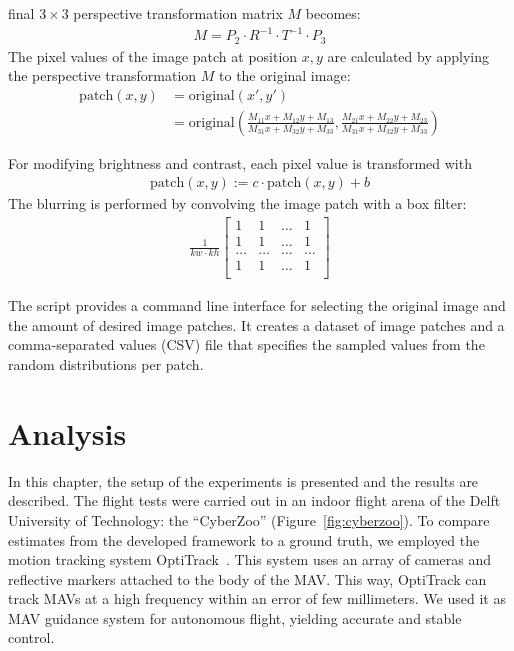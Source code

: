 \documentclass[11pt]{report}
\begin{document}
final $3 \times 3$ perspective transformation matrix $M$ becomes:
\begin{align*}
M =  P_2 \cdot R^{-1} \cdot T^{-1} \cdot P_3
\end{align*}
The pixel values of the image patch at position $x, y$ are calculated
by applying the perspective transformation $M$ to the original image:
\begin{align*}
  \text{patch}(x,y) & = \text{original}(x', y') \\
                    & = \text{original}\left(\frac{M_{11}x + M_{12}y + M_{13}}{M_{31}x + M_{32}y +
  M_{33}}, \frac{M_{21}x + M_{22}y + M_{23}}{M_{31}x + M_{32}y +
  M_{33}}\right)
\end{align*}

For modifying brightness and contrast, each pixel value is transformed
with
\begin{align*}
\text{patch}(x,y) := c \cdot \text{patch}(x,y) + b  
\end{align*}
The blurring is performed by convolving the image patch with a box
filter:
\begin{align*}
  \frac{1}{kw \cdot kh} 
  \begin{bmatrix}
    1 & 1 & \ldots & 1\\
    1 & 1 & \ldots & 1\\
    \ldots & \ldots & \ldots & \ldots\\
    1 & 1 & \ldots & 1\\
  \end{bmatrix}
\end{align*}

The script provides a command line interface for selecting the
original image and the amount of desired image patches. It creates a
dataset of image patches and a comma-separated values (CSV) file that
specifies the sampled values from the random distributions per patch.

\chapter{Analysis}
\label{chap:analysis}
In this chapter, the setup of the experiments is presented and the
results are described. %
The flight tests were carried out in an indoor flight arena of the
Delft University of Technology: the ``CyberZoo''
(Figure~\ref{fig:cyberzoo}).
To compare estimates from the developed framework to a ground truth,
we employed the motion tracking system OptiTrack~\cite{opti}. This
system uses an array of cameras and reflective markers attached to the
body of the MAV. This way, OptiTrack can track MAVs at a high
frequency within an error of few millimeters. We used it as MAV
guidance system for autonomous flight, yielding accurate and stable
control.
\end{document}
